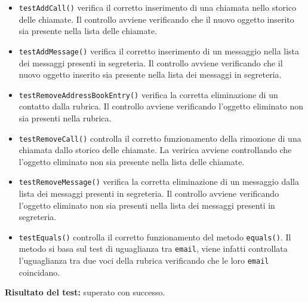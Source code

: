 \begin{itemize}
\begin{itemize}
\item \texttt{testAddCall()} verifica il corretto inserimento di una chiamata nello storico delle chiamate.
Il controllo avviene verificando che il nuovo oggetto inserito sia presente nella lista delle chiamate. 

\item \texttt{testAddMessage()}  verifica il corretto inserimento di un messaggio nella lista dei messaggi presenti in segreteria.
Il controllo avviene verificando che il nuovo oggetto inserito sia presente nella lista dei messaggi in segreteria. 

\item \texttt{testRemoveAddressBookEntry()} verifica la corretta eliminazione di un contatto dalla rubrica.
Il controllo avviene verificando l'oggetto eliminato non sia presenti nella rubrica.  

\item \texttt{testRemoveCall()} controlla il corretto funzionamento della rimozione di una chiamata dallo storico delle chiamate. La veririca avviene controllando che l'oggetto eliminato non sia presente nella lista delle chiamate.

\item \texttt{testRemoveMessage()} verifica la corretta eliminazione di un messaggio dalla lista dei messaggi presenti in segreteria.
Il controllo avviene verificando l'oggetto eliminato non sia presenti nella lista dei messaggi presenti in segreteria. 

\item \texttt{testEquals()} controlla  il corretto funzionamento del metodo \texttt{equals()}. Il metodo si basa sul test di uguaglianza tra \texttt{email}, viene infatti controllata l'uguaglianza tra due voci della rubrica verificando che le loro \texttt{email} coincidano. 

\end{itemize}
\textbf{Risultato del test:} superato con successo.
\end{itemize}

